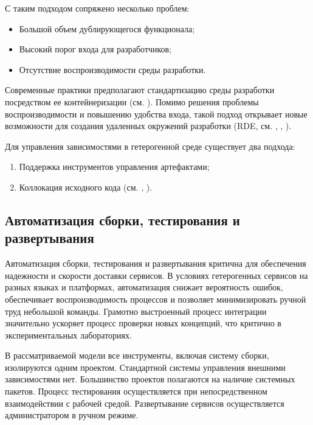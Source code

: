 \documentclass[../thesis.tex]{subfiles}
\begin{document}
	С таким подходом сопряжено несколько проблем:

	\begin{itemize}
		\item Большой объем дублирующегося функционала;

		\item Высокий порог входа для разработчиков;

		\item Отсутствие воспроизводимости среды разработки.
	\end{itemize}

	Современные практики предполагают стандартизацию среды разработки посредством ее контейнеризации (см.
	\cite{devcontainers}). Помимо решения проблемы воспроизводимости и повышению удобства входа,
	такой подход открывает новые возможности для создания удаленных окружений разработки (RDE, см. \cite{rde},
	\cite{rde-uber}, \cite{tailscale}).

	Для управления зависимостями в гетерогенной среде существует два подхода:

	\begin{enumerate}
		\item Поддержка инструментов управления артефактами;

		\item Коллокация исходного кода (см. \cite{monorepo}, \cite{monorepo-google}).
	\end{enumerate}

	\subsection{Автоматизация сборки, тестирования и развертывания}

	Автоматизация сборки, тестирования и развертывания критична для обеспечения надежности и скорости
	доставки сервисов. В условиях гетерогенных сервисов на разных языках и платформах, автоматизация снижает
	вероятность ошибок, обеспечивает воспроизводимость процессов и позволяет минимизировать ручной
	труд небольшой команды. Грамотно выстроенный процесс интеграции значительно ускоряет процесс проверки
	новых концепций, что критично в экспериментальных лабораториях.

	В рассматриваемой модели все инструменты, включая систему сборки, изолируются одним проектом. Стандартной
	системы управления внешними зависимостями нет. Большинство проектов полагаются на наличие
	системных пакетов. Процесс тестирования осуществляется при непосредственном взаимодействии с рабочей
	средой. Развертывание сервисов осуществляется администратором в ручном режиме.
\end{document}
